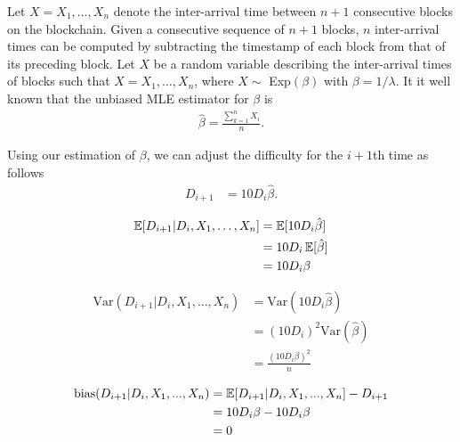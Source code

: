 
 Let $X = X_1, \ldots, X_n$ denote the inter-arrival time between $n+1$ consecutive blocks on the blockchain. Given a consecutive sequence of $n+1$ blocks, $n$ inter-arrival times can be computed by subtracting the timestamp of each block from that of its preceding block. Let $X$ be a random variable describing the inter-arrival times of blocks such that $X = X_1, \dots, X_{n}$, where $X \sim$ Exp$(\beta)$ with $\beta = 1/\lambda$. It it well known that the unbiased MLE estimator for $\beta$ is
\begin{align}
\hat{\beta} = \frac{\sum_{k=1}^{n} X_i}{n}.
\end{align}

Using our estimation of $\beta$, we can adjust the difficulty for the $i+1$th time as follows 
\begin{align}
D_{i+1} &= 10 D_i \hat{\beta}.
\end{align}

\begin{align}
\operatorname{\mathbb{E}}[D_{i+1} | D_{i}, X_1, \dots, X_{n}] &= \operatorname{\mathbb{E}}[10 D_i \hat{\beta}] \\
&= 10 D_i \operatorname{\mathbb{E}}[\hat{\beta}] \\
&= 10 D_i\beta
\end{align}

\begin{align}
\text{Var}(D_{i+1} | D_{i}, X_1, \dots, X_{n}) &= \text{Var}(10 D_i \hat{\beta}) \\
&= (10 D_i)^2 \text{Var}(\hat{\beta}) \\
&= \frac{(10 D_i\beta)^2}{n}
\end{align}

\begin{align}
\text{bias}(D_{i+1}|D_i,X_1,...,X_n) &= \operatorname{\mathbb{E}}[D_{i+1}|D_i,X_1,...,X_n] - D_{i+1} \\
&= 10 D_i\beta - 10 D_i\beta \\
&= 0
\end{align}

